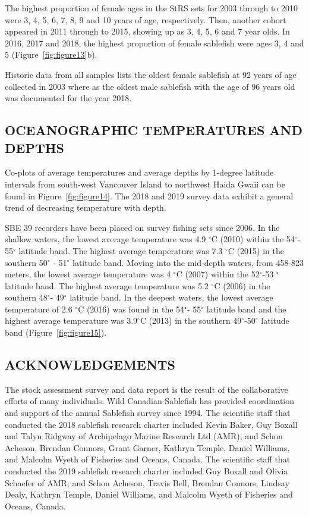 \documentclass[12pt]{article}\usepackage[]{graphicx}\usepackage[]{color}
\begin{document}
The highest proportion of female ages in the StRS sets for 2003 through to 2010 were 3, 4, 5, 6, 7, 8, 9 and 10 years of age, respectively. Then, another cohort appeared in 2011 through to 2015, showing up as 3, 4, 5, 6 and 7 year olds. In 2016, 2017 and 2018, the highest proportion of female sablefish were ages 3, 4 and 5 (Figure~\ref{fig:figure13}b).

Historic data from all samples lists the oldest female sablefish at 92 years of age collected in 2003 where as the oldest male sablefish with the age of 96 years old was documented for the year 2018.

\hypertarget{oceanographic-temperatures-and-depths}{%
\subsection{OCEANOGRAPHIC TEMPERATURES AND DEPTHS}\label{oceanographic-temperatures-and-depths}}

Co-plots of average temperatures and average depths by 1-degree latitude intervals from south-west Vancouver Island to northwest Haida Gwaii can be found in Figure~\ref{fig:figure14}. The 2018 and 2019 survey data exhibit a general trend of decreasing temperature with depth.

SBE 39 recorders have been placed on survey fishing sets since 2006. In the shallow waters, the lowest average temperature was 4.9 \(^\circ\)C (2010) within the 54\(^\circ\)- 55\(^\circ\) latitude band. The highest average temperature was 7.3 \(^\circ\)C (2015) in the southern 50\(^\circ\) - 51\(^\circ\) latitude band. Moving into the mid-depth waters, from 458-823 meters, the lowest average temperature was 4 \(^\circ\)C (2007) within the 52\(^\circ\)-53 \(^\circ\) latitude band. The highest average temperature was 5.2 \(^\circ\)C (2006) in the southern 48\(^\circ\)- 49\(^\circ\) latitude band. In the deepest waters, the lowest average temperature of 2.6 \(^\circ\)C (2016) was found in the 54\(^\circ\)- 55\(^\circ\) latitude band and the highest average temperature was 3.9\(^\circ\)C (2013) in the southern 49\(^\circ\)-50\(^\circ\) latitude band (Figure~\ref{fig:figure15}).

\hypertarget{acknowledgements}{%
\subsection{ACKNOWLEDGEMENTS}\label{acknowledgements}}

The stock assessment survey and data report is the result of the collaborative efforts of many individuals. Wild Canadian Sablefish has provided coordination and support of the annual Sablefish survey since 1994. The scientific staff that conducted the 2018 sablefish research charter included Kevin Baker, Guy Boxall and Talyn Ridgway of Archipelago Marine Research Ltd (AMR); and Schon Acheson, Brendan Connors, Grant Garner, Kathryn Temple, Daniel Williams, and Malcolm Wyeth of Fisheries and Oceans, Canada. The scientific staff that conducted the 2019 sablefish research charter included Guy Boxall and Olivia Schaefer of AMR; and Schon Acheson, Travis Bell, Brendan Connors, Lindsay Dealy, Kathryn Temple, Daniel Williams, and Malcolm Wyeth of Fisheries and Oceans, Canada.
\end{document}
